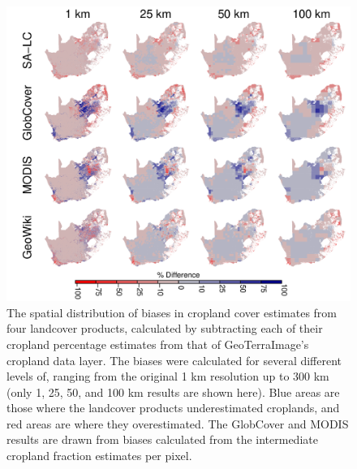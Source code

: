 \documentclass[11 pt]{article}
\begin{document}
\begin{figure}[H]
\includegraphics[width = \linewidth]{../figures/bias_map.pdf}
\caption{The spatial distribution of biases in cropland cover estimates from four landcover products, calculated by subtracting each of their cropland percentage estimates from that of GeoTerraImage's cropland data layer. The biases were calculated for several different levels of, ranging from the original 1 km resolution up to 300 km (only 1, 25, 50, and 100 km results are shown here). Blue areas are those where the landcover products underestimated croplands, and red areas are where they overestimated. The GlobCover and MODIS results are drawn from biases calculated from the intermediate cropland fraction estimates per pixel.}
\end{figure}
\end{document}
